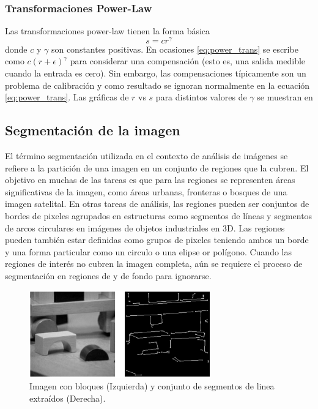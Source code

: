 		\subsubsection{Transformaciones Power-Law}
		Las transformaciones power-law tienen la forma básica
		\begin{equation}\label{eq:power_trans}
			s = cr^\gamma
		\end{equation}
		donde $c$ y $\gamma$ son constantes positivas. En ocasiones \ref{eq:power_trans} se escribe como $c(r+\epsilon)^\gamma$	para considerar una compensación (esto es, una salida medible cuando la entrada es cero). Sin embargo, las compensaciones típicamente son un problema de calibración y como resultado se ignoran normalmente en la ecuación \ref{eq:power_trans}. Las gráficas de $r$ vs $s$ para distintos valores de $\gamma$ se muestran en
		
		
        \subsection{Segmentación de la imagen}
            El término segmentación utilizada en el contexto de análisis de imágenes se refiere a la partición de una imagen en un conjunto de regiones que la cubren. El objetivo en muchas de las tareas es que para las regiones se representen áreas significativas de la imagen, como áreas urbanas, fronteras o bosques de una imagen satelital. En otras tareas de análisis, las regiones pueden ser conjuntos de bordes de pixeles agrupados en estructuras como segmentos de líneas y segmentos de arcos circulares en imágenes de objetos industriales en 3D. Las regiones pueden también estar definidas como grupos de pixeles teniendo ambos un borde y una forma particular como un circulo o una elipse or polígono. Cuando las regiones de interés no cubren la imagen completa, aún se requiere el proceso de segmentación en regiones de y de fondo para ignorarse. 
            \cite{imgAnalySeg}
            \begin{figure}[H]
                \centering
                \includegraphics[width=0.7\textwidth]{capitulo2/images/segmentation.PNG}
                \caption{Imagen con bloques (Izquierda) y conjunto de segmentos de linea extraídos (Derecha).}
                \label{fig:segmentacion}
            \end{figure}
  
